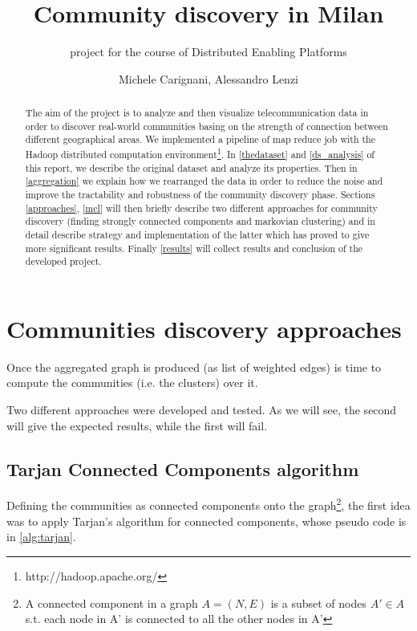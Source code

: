\documentclass[12pt,a4paper]{article}
\author{Michele Carignani, Alessandro Lenzi}
\title{Community discovery in Milan}
\subtitle{project for the course of Distributed Enabling Platforms}
\begin{document}
\maketitle
\tableofcontents

\begin{abstract}
The aim of the project is to analyze and then visualize telecommunication data
in order to discover real-world communities basing on the strength of connection
between different geographical areas. We implemented a pipeline of
map reduce job with the Hadoop distributed computation
environment\footnote{http://hadoop.apache.org/}.
In \ref{thedataset} and \ref{ds_analysis} of this report, we describe the original dataset
and analyze its properties. Then in \ref{aggregation}
we explain how we rearranged the data in
order to reduce the noise and improve the tractability and robustness of the
community discovery phase. Sections \ref{approaches}, \ref{mcl} will then
briefly describe two different approaches for community discovery
(finding strongly connected components and markovian clustering)
and in detail describe strategy and implementation of the latter which has
proved to give more significant results.
Finally \ref{results} will collect results and conclusion of the developed project.
\end{abstract}








\section{Communities discovery approaches}
\label{approaches}

Once the aggregated graph is produced (as list of weighted edges) is time to compute
the communities (i.e. the clusters) over it.

Two different approaches were developed and tested. 
As we will see, the second will give the
expected results, while the first will fail.

\subsection{Tarjan Connected Components algorithm}

Defining the communities as connected components onto the graph\footnote{A connected component
in a graph $A = (N,E)$ is a subset of nodes $A' \in A$  s.t. each node in A' is connected to 
all the other nodes in A' 
}, the first idea was to apply Tarjan's algorithm for connected components, whose pseudo code is in \ref{alg:tarjan}.
\end{document}
